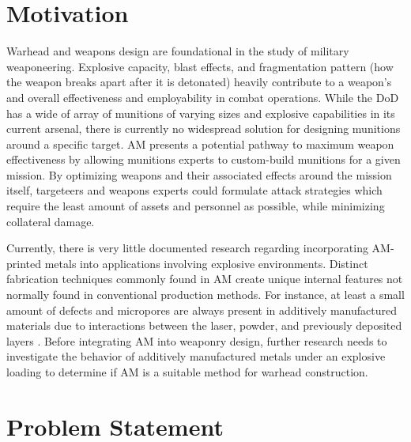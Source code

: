 \section{Motivation}
Warhead and weapons design are foundational in the study of military weaponeering. Explosive capacity, blast effects, and fragmentation pattern (how the weapon breaks apart after it is detonated) heavily contribute to a weapon's and overall effectiveness and employability in combat operations. While the \gls{DoD} has a wide of array of munitions of varying sizes and explosive capabilities in its current arsenal, there is currently no widespread solution for designing munitions around a specific target. \gls{AM} presents a potential pathway to maximum weapon effectiveness by allowing munitions experts to custom-build munitions for a given mission. By optimizing weapons and their associated effects around the mission itself, targeteers and weapons experts could formulate attack strategies which require the least amount of assets and personnel as possible, while minimizing collateral damage.  

Currently, there is very little documented research regarding incorporating \gls{AM}-printed metals into applications involving explosive environments. Distinct fabrication techniques commonly found in \gls{AM} create unique internal features not normally found in conventional production methods. For instance, at least a small amount of defects and micropores are always present in additively manufactured materials due to interactions between the laser, powder, and previously deposited layers \cite{ChoiSLMDensity}. Before integrating \gls{AM} into weaponry design, further research needs to investigate the behavior of additively manufactured metals under an explosive loading to determine if \gls{AM} is a suitable method for warhead construction.


\section{Problem Statement}
\label{ProblemStatement}

